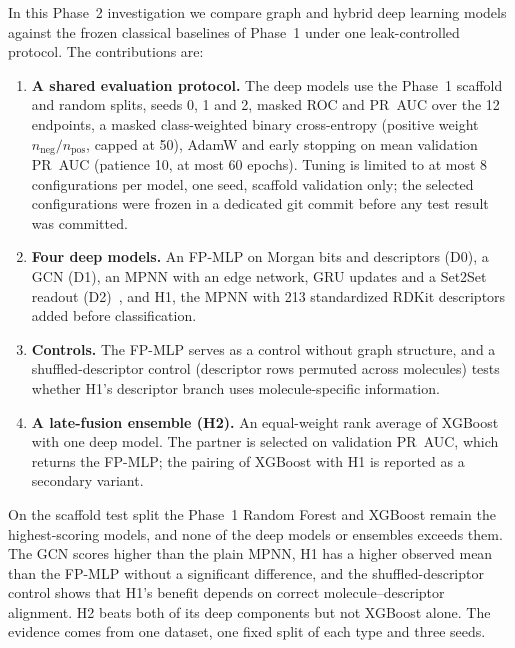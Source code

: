 In this Phase~2 investigation we compare graph and hybrid deep learning models against the frozen classical baselines of Phase~1 under one leak-controlled protocol. The contributions are:
\begin{enumerate}
    \item \textbf{A shared evaluation protocol.} The deep models use the Phase~1 scaffold~\cite{bemis1996properties} and random splits, seeds 0, 1 and 2, masked ROC and PR~AUC over the 12 endpoints, a masked class-weighted binary cross-entropy (positive weight $n_{\text{neg}}/n_{\text{pos}}$, capped at 50), AdamW and early stopping on mean validation PR~AUC (patience 10, at most 60 epochs). Tuning is limited to at most 8 configurations per model, one seed, scaffold validation only; the selected configurations were frozen in a dedicated git commit before any test result was committed.
    \item \textbf{Four deep models.} An FP-MLP on Morgan bits and descriptors (D0), a GCN (D1), an MPNN with an edge network, GRU updates and a Set2Set readout (D2)~\cite{gilmer2017neural,vinyals2015order}, and H1, the MPNN with 213 standardized RDKit descriptors added before classification.
    \item \textbf{Controls.} The FP-MLP serves as a control without graph structure, and a shuffled-descriptor control (descriptor rows permuted across molecules) tests whether H1's descriptor branch uses molecule-specific information.
    \item \textbf{A late-fusion ensemble (H2).} An equal-weight rank average of XGBoost with one deep model. The partner is selected on validation PR~AUC, which returns the FP-MLP; the pairing of XGBoost with H1 is reported as a secondary variant.
\end{enumerate}

On the scaffold test split the Phase~1 Random Forest and XGBoost remain the highest-scoring models, and none of the deep models or ensembles exceeds them. The GCN scores higher than the plain MPNN, H1 has a higher observed mean than the FP-MLP without a significant difference, and the shuffled-descriptor control shows that H1's benefit depends on correct molecule--descriptor alignment. H2 beats both of its deep components but not XGBoost alone. The evidence comes from one dataset, one fixed split of each type and three seeds.
